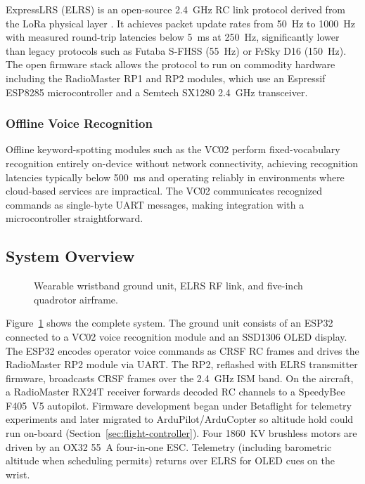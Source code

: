 ExpressLRS (ELRS) is an open-source 2.4~GHz RC link protocol derived from the LoRa physical
layer \cite{elrs-github}.
It achieves packet update rates from 50~Hz to 1000~Hz with measured round-trip latencies
below 5~ms at 250~Hz, significantly lower than legacy protocols such as Futaba S-FHSS
(55~Hz) or FrSky D16 (150~Hz).
The open firmware stack allows the protocol to run on commodity hardware including the
RadioMaster RP1 and RP2 modules, which use an Espressif ESP8285 microcontroller and a
Semtech SX1280 2.4~GHz transceiver.

\subsubsection{Offline Voice Recognition}

Offline keyword-spotting modules such as the VC02 perform fixed-vocabulary recognition
entirely on-device without network connectivity, achieving recognition latencies typically below
500~ms and operating reliably in environments where cloud-based services are impractical.
The VC02 communicates recognized commands as single-byte UART messages, making
integration with a microcontroller straightforward.

\subsection{System Overview}

\begin{figure}[htb!]
    \centering
    \caption{Wearable wristband ground unit, ELRS RF link, and five-inch quadrotor airframe.}
    \label{fig:block-diagram}
\end{figure}

Figure~\ref{fig:block-diagram} shows the complete system.
The ground unit consists of an ESP32 connected to a VC02 voice recognition module and an
SSD1306 OLED display.
The ESP32 encodes operator voice commands as CRSF RC frames and drives the RadioMaster RP2
module via UART.
The RP2, reflashed with ELRS transmitter firmware, broadcasts CRSF frames over the 2.4~GHz ISM band.
On the aircraft, a RadioMaster RX24T receiver forwards decoded RC channels to a SpeedyBee F405~V5
autopilot.
Firmware development began under Betaflight for telemetry experiments and later migrated to
ArduPilot/ArduCopter so altitude hold could run on-board (Section~\ref{sec:flight-controller}).
Four 1860~KV brushless motors are driven by an OX32 55~A four-in-one ESC\@.
Telemetry (including barometric altitude when scheduling permits) returns over ELRS for OLED cues on
the wrist.

